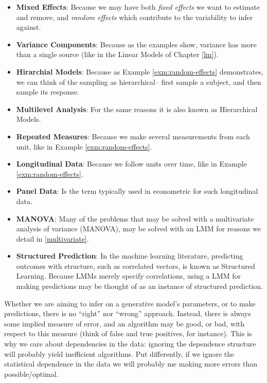 \documentclass[]{book}
\theoremstyle{definition}
\theoremstyle{definition}
\theoremstyle{definition}
\theoremstyle{remark}
\begin{document}
\begin{itemize}
\item
  \textbf{Mixed Effects}: Because we may have both \emph{fixed effects}
  we want to estimate and remove, and \emph{random effects} which
  contribute to the variability to infer against.
\item
  \textbf{Variance Components}: Because as the examples show, variance
  has more than a single source (like in the Linear Models of Chapter
  \ref{lm}).
\item
  \textbf{Hirarchial Models}: Because as Example
  \ref{exm:random-effects} demonstrates, we can think of the sampling as
  hierarchical-- first sample a subject, and then sample its response.
\item
  \textbf{Multilevel Analysis}: For the same reasons it is also known as
  Hierarchical Models.
\item
  \textbf{Repeated Measures}: Because we make several measurements from
  each unit, like in Example \ref{exm:random-effects}.
\item
  \textbf{Longitudinal Data}: Because we follow units over time, like in
  Example \ref{exm:random-effects}.
\item
  \textbf{Panel Data}: Is the term typically used in econometric for
  such longitudinal data.
\item
  \textbf{MANOVA}: Many of the problems that may be solved with a
  multivariate analysis of variance (MANOVA), may be solved with an LMM
  for reasons we detail in \ref{multivariate}.
\item
  \textbf{Structured Prediction}: In the machine learning literature,
  predicting outcomes with structure, such as correlated vectors, is
  known as Structured Learning. Because LMMs merely specify
  correlations, using a LMM for making predictions may be thought of as
  an instance of structured prediction.
\end{itemize}

Whether we are aiming to infer on a generative model's parameters, or to
make predictions, there is no ``right'' nor ``wrong'' approach. Instead,
there is always some implied measure of error, and an algorithm may be
good, or bad, with respect to this measure (think of false and true
positives, for instance). This is why we care about dependencies in the
data: ignoring the dependence structure will probably yield inefficient
algorithms. Put differently, if we ignore the statistical dependence in
the data we will probably me making more errors than possible/optimal.
\end{document}
